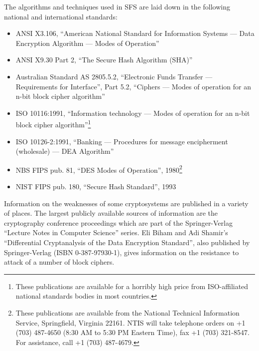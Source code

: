 The algorithms and techniques used in SFS are laid down in the following
national and international standards:

\begin{itemize}

\item ANSI X3.106, ``American National Standard for Information Systems --- Data
        Encryption Algorithm --- Modes of Operation''

\item ANSI X9.30 Part 2, ``The Secure Hash Algorithm (SHA)''

\item Australian Standard AS 2805.5.2, ``Electronic Funds Transfer --- Requirements
        for Interface'', Part 5.2, ``Ciphers --- Modes of operation for an n-bit
        block cipher algorithm''

\item ISO 10116:1991, ``Information technology --- Modes of operation for an n-bit
        block cipher algorithm''\footnote{
		These publications are available for a horribly high price from
                ISO-affiliated national standards bodies in most countries.
  }

\item ISO 10126-2:1991, ``Banking --- Procedures for message encipherment
        (wholesale) --- DEA Algorithm''

\item NBS FIPS pub. 81, ``DES Modes of Operation'', 1980\footnote{
		These publications are available from the National Technical
              	Information Service, Springfield, Virginia 22161.  NTIS will take
              	telephone orders on +1 (703) 487-4650 (8:30 AM to 5:30 PM Eastern
              	Time), fax +1 (703) 321-8547.  For assistance, call +1 (703)
              	487-4679.
  }

\item NIST FIPS pub. 180, ``Secure Hash Standard'', 1993

\end{itemize}

Information on the weaknesses of some cryptosystems are published in a variety
of places.  The largest publicly available sources of information are the
cryptography conference proceedings which are part of the Springer-Verlag
``Lecture Notes in Computer Science'' series.  Eli Biham and Adi Shamir's
``Differential Cryptanalysis of the Data Encryption Standard'', also published by
Springer-Verlag (ISBN 0-387-97930-1), gives information on the resistance to
attack of a number of block ciphers.

